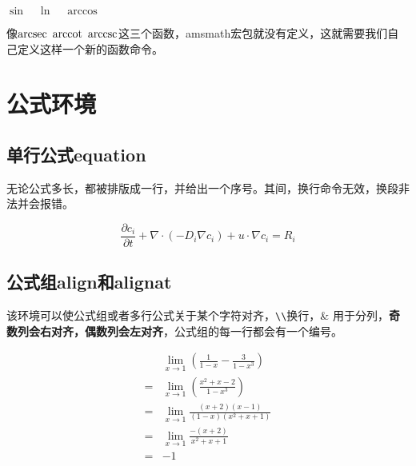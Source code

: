 \begin{codeshow}
$ \sin \quad \ln \quad \arccos $
\end{codeshow}

像$ \arcsec~\arccot~\arccsc $这三个函数，amsmath宏包就没有定义，这就需要我们自己定义这样一个新的函数命令。
\begin{latex}
\DeclareMathOperator{\arcsec}{arcsec}
\DeclareMathOperator{\arccot}{arccot}
\DeclareMathOperator{\arccsc}{arccsc}
\end{latex}

\section{公式环境}

\subsection{单行公式equation}

无论公式多长，都被排版成一行，并给出一个序号。其间，换行命令无效，换段非法并会报错。

\begin{codeshow}
\begin{equation}
\frac{\partial c_i}{\partial t}+\nabla \cdot (-D_{i} \nabla c_{i})+u \cdot \nabla c_{i}=R_i
\end{equation}
\end{codeshow}



\subsection{公式组align和alignat}

该环境可以使公式组或者多行公式关于某个字符对齐，\lstinline|\\|换行，\& 用于分列，\textbf{奇数列会右对齐，偶数列会左对齐}，公式组的每一行都会有一个编号。

\begin{latex}
\begin{align}
&\lim\limits_{x\to 1}\left(\frac{1}{1-x}-\frac{3}{1-x^3}\right)\\
= &\lim\limits_{x\to 1}\left(\frac{x^2+x-2}{1-x^3}\right)  \\
= & \lim\limits_{x\to 1}\frac{(x+2)(x-1)}{(1-x)(x^2+x+1)}\\
= & \lim\limits_{x\to 1}\frac{-(x+2)}{x^2+x+1}\\
= & -1
\end{align}
\end{latex}

